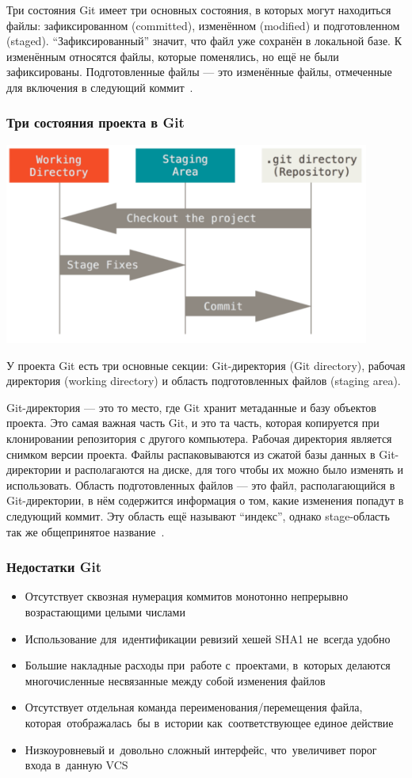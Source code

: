 \documentclass{../industrial-development}
\begin{document}
Три состояния
Git имеет три основных состояния, в которых могут находиться файлы: зафиксированном (committed), изменённом (modified) и подготовленном (staged). “Зафиксированный” значит, что файл уже сохранён в локальной базе. К изменённым относятся файлы, которые поменялись, но ещё не были зафиксированы. Подготовленные файлы — это изменённые файлы, отмеченные для включения в следующий коммит~\cite[с.~8-10]{ProGit}.

\begin{frame} \frametitle{Три состояния проекта в Git}
  \centerline{\includegraphics[width=0.9\textwidth]{GitSections.pdf}}
\end{frame}

\lecturenotes

У проекта Git есть три основные секции: Git-директория (Git directory), рабочая директория (working directory) и область подготовленных файлов (staging area).

Git-директория --- это то место, где Git хранит метаданные и базу объектов проекта. Это самая важная часть Git, и это та часть, которая копируется при клонировании репозитория с другого компьютера.
Рабочая директория является снимком версии проекта. Файлы распаковываются из сжатой базы данных в Git-директории и располагаются на диске, для того чтобы их можно было изменять и использовать.
Область подготовленных файлов — это файл, располагающийся в Git-директории, в нём содержится информация о том, какие изменения попадут в следующий коммит. Эту область ещё называют “индекс”, однако stage-область так же общепринятое название~\cite[с.~11]{ProGit}.

\begin{frame} \frametitle{Недостатки Git}
  
  \begin{itemize}
  \item Отсутствует сквозная нумерация коммитов монотонно непрерывно возрастающими целыми числами
  \item Использование для~идентификации ревизий хешей SHA1 не~всегда удобно
  \item Большие накладные расходы при~работе с~проектами, в~которых делаются многочисленные несвязанные между собой изменения файлов
  \item Отсутствует отдельная команда переименования/перемещения файла, которая~отображалась~бы в~истории как~соответствующее единое действие
  \item Низкоуровневый и~довольно сложный интерфейс, что~увеличивет порог входа в~данную VCS
  \end{itemize}
\end{frame}
\end{document}
